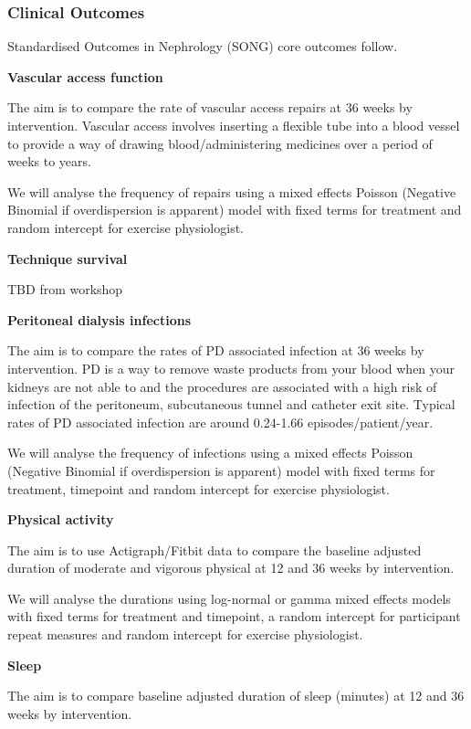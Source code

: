 \documentclass[
]{article}
\begin{document}
\hypertarget{clinical-outcomes}{%
  \subsubsection{Clinical Outcomes}\label{clinical-outcomes}}

Standardised Outcomes in Nephrology (SONG) core outcomes follow.

\textbf{Vascular access function}

The aim is to compare the rate of vascular access repairs at 36 weeks by intervention.
Vascular access involves inserting a flexible tube into a blood vessel to provide a way of drawing blood/administering medicines over a period of weeks to years.

We will analyse the frequency of repairs using a mixed effects Poisson (Negative Binomial if overdispersion is apparent) model with fixed terms for treatment and random intercept for exercise physiologist.

\textbf{Technique survival}

TBD from workshop

\textbf{Peritoneal dialysis infections}

The aim is to compare the rates of PD associated infection at 36 weeks by intervention.
PD is a way to remove waste products from your blood when your kidneys are not able to and the procedures are associated with a high risk of infection of the peritoneum, subcutaneous tunnel and catheter exit site.
Typical rates of PD associated infection are around 0.24-1.66 episodes/patient/year.

We will analyse the frequency of infections using a mixed effects Poisson (Negative Binomial if overdispersion is apparent) model with fixed terms for treatment, timepoint and random intercept for exercise physiologist.

\textbf{Physical activity}

The aim is to use Actigraph/Fitbit data to compare the baseline adjusted duration of moderate and vigorous physical at 12 and 36 weeks by intervention.

We will analyse the durations using log-normal or gamma mixed effects models with fixed terms for treatment and timepoint, a random intercept for participant repeat measures and random intercept for exercise physiologist.

\textbf{Sleep}

The aim is to compare baseline adjusted duration of sleep (minutes) at 12 and 36 weeks by intervention.
\end{document}

